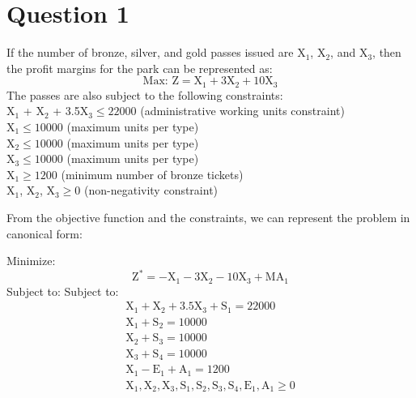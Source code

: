 \section*{Question 1}
If the number of bronze, silver, and gold passes issued are X$_1$, X$_2$, and X$_3$, then the profit margins for the park can be represented as:
\begin{equation*}
	\text{Max: } \text{Z} = \text{X}_1 + 3\text{X}_2 + 10\text{X}_3
\end{equation*}
The passes are also subject to the following constraints:\\
X$_1$ + X$_2$ + 3.5X$_3 \leq 22000$ (administrative working units constraint)\\
X$_1 \leq 10000$ (maximum units per type)\\
X$_2 \leq 10000$ (maximum units per type)\\
X$_3 \leq 10000$ (maximum units per type)\\
X$_1 \geq 1200$ (minimum number of bronze tickets)\\
X$_1$, X$_2$, X$_3 \geq 0$ (non-negativity constraint)

From the objective function and the constraints, we can represent the problem in canonical form:

Minimize:
\begin{equation*}
	\text{Z}^* = -\text{X}_1 - 3\text{X}_2 - 10\text{X}_3 + \text{MA}_1
\end{equation*}
Subject to:
Subject to:
\begin{gather*}
	\text{X}_1 + \text{X}_2 + 3.5\text{X}_3 + \text{S}_1 = 22000 \\
	\text{X}_1 + \text{S}_2 = 10000 \\
	\text{X}_2 + \text{S}_3 = 10000 \\
	\text{X}_3 + \text{S}_4 = 10000 \\
	\text{X}_1 - \text{E}_1 + \text{A}_1 = 1200 \\
	\text{X}_1, \text{X}_2, \text{X}_3, \text{S}_1, \text{S}_2, \text{S}_3, \text{S}_4, \text{E}_1, \text{A}_1 \geq 0
\end{gather*}

